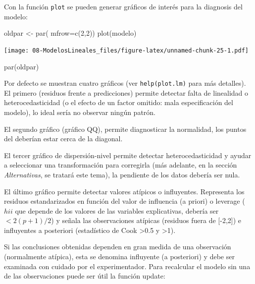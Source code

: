 \documentclass[
]{book}
\newenvironment{Shaded}{\begin{snugshade}}{\end{snugshade}}
\newcommand{\AttributeTok}[1]{\textcolor[rgb]{0.77,0.63,0.00}{#1}}
\newcommand{\DecValTok}[1]{\textcolor[rgb]{0.00,0.00,0.81}{#1}}
\newcommand{\FunctionTok}[1]{\textcolor[rgb]{0.00,0.00,0.00}{#1}}
\newcommand{\NormalTok}[1]{#1}
\newcommand{\OtherTok}[1]{\textcolor[rgb]{0.56,0.35,0.01}{#1}}
\theoremstyle{break}
\begin{document}
Con la función \texttt{plot} se pueden generar gráficos de interés para la diagnosis del modelo:

\begin{Shaded}
\begin{Highlighting}[]
\NormalTok{oldpar }\OtherTok{\textless{}{-}} \FunctionTok{par}\NormalTok{( }\AttributeTok{mfrow=}\FunctionTok{c}\NormalTok{(}\DecValTok{2}\NormalTok{,}\DecValTok{2}\NormalTok{))}
\FunctionTok{plot}\NormalTok{(modelo)}
\end{Highlighting}
\end{Shaded}

\texttt{[image: 08-ModelosLineales\_files/figure-latex/unnamed-chunk-25-1.pdf]}

\begin{Shaded}
\begin{Highlighting}[]
\FunctionTok{par}\NormalTok{(oldpar)}
\end{Highlighting}
\end{Shaded}

Por defecto se muestran cuatro gráficos (ver \texttt{help(plot.lm)} para más detalles). El primero (residuos frente a predicciones) permite detectar falta de
linealidad o heterocedasticidad (o el efecto de un factor omitido: mala
especificación del modelo), lo ideal sería no observar ningún patrón.

El segundo gráfico (gráfico QQ), permite diagnosticar la normalidad, los puntos del deberían estar cerca de la diagonal.

El tercer gráfico de dispersión-nivel permite detectar heterocedasticidad y ayudar a seleccionar una transformación para corregirla (más adelante, en la sección \emph{Alternativas}, se tratará este tema), la pendiente de los datos debería ser nula.

El último gráfico permite detectar valores atípicos o influyentes. Representa los residuos estandarizados en función del valor de influencia (a priori) o leverage (\(hii\) que depende de los valores de las variables explicativas, debería ser \(< 2(p+1)/2\)) y señala las observaciones atípicas (residuos fuera de {[}-2,2{]}) e influyentes a posteriori (estadístico de Cook \textgreater0.5 y \textgreater1).

Si las conclusiones obtenidas dependen en gran medida de una
observación (normalmente atípica), esta se denomina influyente (a
posteriori) y debe ser examinada con cuidado por el experimentador.
Para recalcular el modelo sin una de las observaciones puede ser útil la función update:
\end{document}
